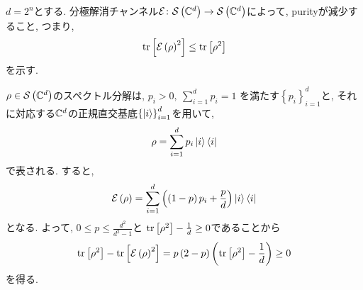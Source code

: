 \begin{ex}
    \label{ex8.18}
    $d = 2^n$とする. 分極解消チャンネル$\mathcal{E} \colon \mathcal{S}\left({\mathbb{C}^{d}}\right) \to \mathcal{S}\left({\mathbb{C}^{d}}\right)$によって, purityが減少すること, つまり, 
    \begin{align*}
        \mathrm{tr}\left[ \mathcal{E} \left(\rho\right)^2\right] 
        \le 
        \mathrm{tr}\left[ \rho^2\right]
    \end{align*}
    を示す. 
    \par
    $\rho \in \mathcal{S}\left({\mathbb{C}^{d}}\right)$のスペクトル分解は, 
    $p_i > 0,\  \sum_{i=1}^d p_i = 1$
    を満たす$\left\{p_i\right\}_{i=1}^d$と, それに対応する$\mathbb{C}^{d}$の正規直交基底$\left\{\ket{i}\right\}_{i=1}^d$を用いて,
    \begin{align*}
        \rho = \sum_{i=1}^d p_i \ket{i}\bra{i}
    \end{align*}
    で表される. すると, 
    \begin{align*}
        \mathcal{E} \left( \rho\right)
        =
        \sum_{i=1}^d
        \left( 
            \left(1-p\right)p_i + \frac{p}{d}
        \right)
        \ket{i}\bra{i}
    \end{align*}
    となる. よって, $0 \le p \le \frac{d^2}{d^2-1}$と $\mathrm{tr}\left[ \rho^2\right] - \frac{1}{d} \ge 0$であることから
    \begin{align*}
        \mathrm{tr}\left[ \rho^2\right] 
        - 
        \mathrm{tr}\left[ \mathcal{E} \left(\rho\right)^2\right] 
        =
        p \left(2-p\right)\left( \mathrm{tr}\left[ \rho^2\right] - \frac{1}{d}\right)
        \ge
        0
    \end{align*}
    を得る.
\end{ex}

